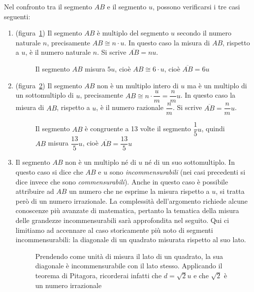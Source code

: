 Nel confronto tra il segmento $AB$ e il segmento $u$, possono verificarsi i tre casi seguenti:
\begin{enumerate}
\item (figura~\ref{fig:mis_segm1}) Il segmento $AB$ è multiplo del segmento $u$ secondo il numero naturale $n$, precisamente $AB\cong n\cdot u$. In questo caso la misura di $AB$, rispetto a $u$, è il numero naturale $n$. Si scrive $\overline{AB} = nu$.

\begin{figure}[htb]
\centering
\caption{Il segmento $AB$ misura $5u$, cioè $AB\cong 6\cdot u$, cioè $\overline{AB}=6u$}\label{fig:mis_segm1}
\end{figure}

\item (figura~\ref{fig:mis_segm2}) Il segmento $AB$ non è un multiplo intero di $u$ ma è un multiplo di un sottomultiplo di $u$, precisamente $AB\cong n\cdot \dfrac{u}{m}=\dfrac{n}{m}u$. In questo caso la misura di $AB$, rispetto a $u$, è il numero razionale $\dfrac{n}{m}$. Si scrive $\overline{AB} = \dfrac{n}{m}u$.

\begin{figure}[htb]
\centering
\caption{Il segmento $AB$ è congruente a 13 volte il segmento $\dfrac{1}{5}u$, quindi $AB$ misura $\dfrac{13}{5}u$, cioè $\overline{AB}=\dfrac{13}{5}u$}\label{fig:mis_segm2}
\end{figure}

\item Il segmento $AB$ non è un multiplo né di $u$ né di un suo sottomultiplo. In questo caso si dice che $AB$ e $u$ sono \emph{incommensurabili} (nei casi precedenti si dice invece che sono \emph{commensurabili}). Anche in questo caso è possibile attribuire ad $AB$ un numero che ne esprime la misura rispetto a $u$, si tratta però di un numero irrazionale. La complessità dell'argomento richiede alcune conoscenze più avanzate di matematica, pertanto la tematica della misura delle grandezze incommensurabili sarà approfondita nel seguito. Qui ci limitiamo ad accennare al caso storicamente più noto di segmenti incommensurabili: la diagonale di un quadrato misurata rispetto al suo lato.

\begin{figure}[htb]
\centering
\caption{Prendendo come unità di misura il lato di un quadrato, la sua diagonale è incommensurabile con il lato stesso. Applicando il teorema di Pitagora, ricorderai infatti che $d=\sqrt{2}u$ e che $\sqrt{2}$ è un numero irrazionale}
\end{figure}


\end{enumerate}

